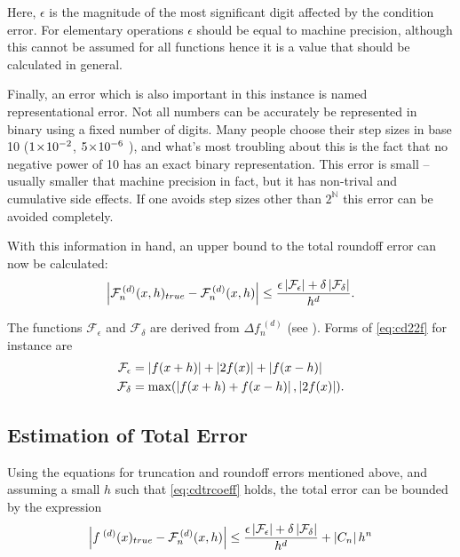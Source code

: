 Here, $\epsilon$ is the magnitude of the most significant digit affected by the condition error.
For elementary operations $\epsilon$ should be equal to machine precision, although this cannot be assumed for all functions hence it is a value that should be calculated in general.

Finally, an error which is also important in this instance is named representational error.
Not all numbers can be accurately be represented in binary using a fixed number of digits.
Many people choose their step sizes in base 10 (\eg $1\!\times\!10^{-2}$, $5\!\times\!10^{-6}$ \etc), and what's most troubling about this is the fact that no negative power of 10 has an exact binary representation.
This error is small -- usually smaller that machine precision in fact, but it has non-trival and cumulative side effects.
If one avoids step sizes other than $2^\mathbb{N}$ this error can be avoided completely.

With this information in hand, an upper bound to the total roundoff error can now be calculated:
\begin{equation}
 \left\lvert \mathcal{F}_n^{\,(d)}(x,h)_{true}-\mathcal{F}_n^{\,(d)}(x,h)\right\rvert \leq \frac{\epsilon\left\lvert \mathcal{F}_\epsilon\right\rvert+\delta\left\lvert \mathcal{F}_\delta\right\rvert}{h^d}.
\end{equation}

The functions $\mathcal{F}_\epsilon$ and $\mathcal{F}_\delta$ are derived from $\Delta f_n^{\;(d)}$ (see ).
Forms of \cref{eq:cd22f} for instance are
\begin{align}
\mathcal{F}_\epsilon &= \left\lvert f(x+h)\right\rvert + \left\lvert 2f(x)\right\rvert + \left\lvert f(x-h)\right\rvert \\
\mathcal{F}_\delta &= \max(\left\lvert f(x+h) + f(x-h)\right\rvert,\left\lvert 2f(x)\right\rvert).
\end{align}

\subsection{Estimation of Total Error}\label{subsec:cdtoterr}

Using the equations for truncation and roundoff errors mentioned above, and assuming a small $h$ such that \cref{eq:cdtrcoeff} holds, the total error can be bounded by the expression
\begin{equation}
\left\lvert f^{\;(d)}(x)_{true}-\mathcal{F}_n^{\,(d)}(x,h)\right\rvert \leq \frac{\epsilon\left\lvert \mathcal{F}_\epsilon\right\rvert+\delta\left\lvert \mathcal{F}_\delta\right\rvert}{h^d} + \left\lvert C_n\right\rvert h^n
\end{equation}


